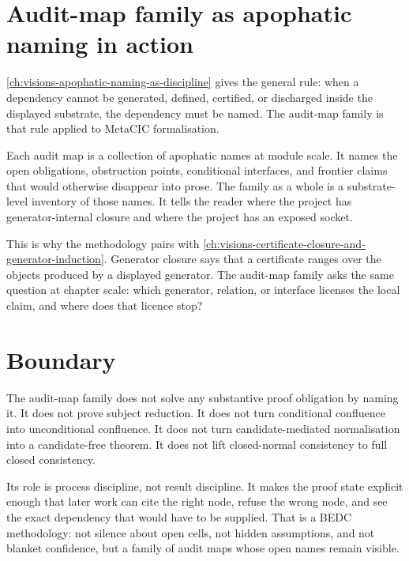 \section{Audit-map family as apophatic naming in action}
\label{sec:audit-map-family-apophatic-application}

\autoref{ch:visions-apophatic-naming-as-discipline} gives the general rule:
when a dependency cannot be generated, defined, certified, or discharged inside
the displayed substrate, the dependency must be named. The audit-map family is
that rule applied to MetaCIC formalisation.

Each audit map is a collection of apophatic names at module scale. It names the
open obligations, obstruction points, conditional interfaces, and frontier
claims that would otherwise disappear into prose. The family as a whole is a
substrate-level inventory of those names. It tells the reader where the project
has generator-internal closure and where the project has an exposed socket.

This is why the methodology pairs with
\autoref{ch:visions-certificate-closure-and-generator-induction}. Generator
closure says that a certificate ranges over the objects produced by a displayed
generator. The audit-map family asks the same question at chapter scale: which
generator, relation, or interface licenses the local claim, and where does that
licence stop?

\section{Boundary}
\label{sec:audit-map-family-boundary}

The audit-map family does not solve any substantive proof obligation by naming
it. It does not prove subject reduction. It does not turn conditional
confluence into unconditional confluence. It does not turn candidate-mediated
normalisation into a candidate-free theorem. It does not lift closed-normal
consistency to full closed consistency.

Its role is process discipline, not result discipline. It makes the proof
state explicit enough that later work can cite the right node, refuse the wrong
node, and see the exact dependency that would have to be supplied. That is a
BEDC methodology: not silence about open cells, not hidden assumptions, and not
blanket confidence, but a family of audit maps whose open names remain visible.

